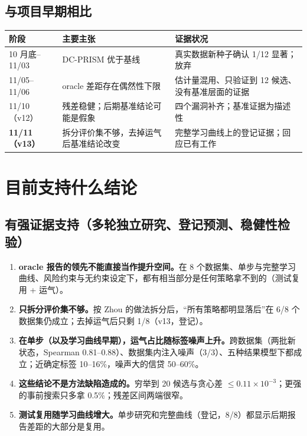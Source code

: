 \documentclass[11pt,a4paper]{article}
\begin{document}
\subsection{与项目早期相比}
\begin{table}[H]
\centering\small
\begin{tabular}{L{2.6cm}L{6.0cm}L{6.4cm}}
\toprule
阶段 & 主要主张 & 证据状况 \\
 月底--11/03 & DC-PRISM 优于基线 & 真实数据新种子确认 1/12 显著；放弃 \\
11/05--11/06 & oracle 差距存在偶然性下限 & 估计量混用、只验证到 12 候选、没有基准层面的证据 \\
11/10（v12） & 残差稳健；后期基准结论可能是假象 & 四个漏洞补齐；基准证据为描述性 \\
\textbf{11/11（v13）} & 拆分评价集不够，去掉运气后基准结论改变 & 完整学习曲线上的登记证据；回应已有工作 \\
\bottomrule
\end{tabular}
\end{table}

\section{目前支持什么结论}
\subsection{有强证据支持（多轮独立研究、登记预测、稳健性检验）}
\begin{enumerate}
\item \textbf{oracle 报告的领先不能直接当作提升空间。}在 8 个数据集、单步与完整学习曲线、风险约束与无约束设定下，都有相当部分是任何策略拿不到的（测试复用 + 运气）。
\item \textbf{只拆分评价集不够。}按 Zhou 的做法拆分后，“所有策略都明显落后”在 6/8 个数据集仍成立；去掉运气后只剩 1/8（v13，登记）。
\item \textbf{在单步（以及学习曲线早期），运气占比随标签噪声上升。}跨数据集（两批新状态，Spearman 0.81--0.88）、数据集内注入噪声（3/3）、五种结果模型下都成立；近确定标签 10--16\%，噪声大的信贷 50--60\%。
\item \textbf{这些结论不是方法缺陷造成的。}穷举到 20 候选与贪心差 $\le0.11\times10^{-3}$；更强的事前搜索只多拿 0.5\%；残差区间两端很窄。
\item \textbf{测试复用随学习曲线增大。}单步研究和完整曲线（登记，8/8）都显示后期报告差距的大部分是复用。
\end{enumerate}
\end{document}
